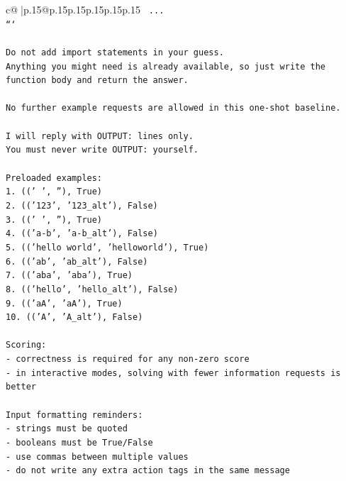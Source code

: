 \documentclass{article}
\begin{document}
{\begin{supertabular}{c@{$\;$}|p{.15\linewidth}@{}p{.15\linewidth}p{.15\linewidth}p{.15\linewidth}p{.15\linewidth}p{.15\linewidth}}
{{{\texttt{    ...} \\
\texttt{```} \\
\\ 
\texttt{Do not add import statements in your guess.} \\
\texttt{Anything you might need is already available, so just write the function body and return the answer.} \\
\\ 
\texttt{No further example requests are allowed in this one{-}shot baseline.} \\
\\ 
\texttt{I will reply with OUTPUT: lines only.} \\
\texttt{You must never write OUTPUT: yourself.} \\
\\ 
\texttt{Preloaded examples:} \\
\texttt{1. ((' ', ''), True)} \\
\texttt{2. (('123', '123\_alt'), False)} \\
\texttt{3. (('   ', ''), True)} \\
\texttt{4. (('a{-}b', 'a{-}b\_alt'), False)} \\
\texttt{5. (('hello world', 'helloworld'), True)} \\
\texttt{6. (('ab', 'ab\_alt'), False)} \\
\texttt{7. (('aba', 'aba'), True)} \\
\texttt{8. (('hello', 'hello\_alt'), False)} \\
\texttt{9. (('aA', 'aA'), True)} \\
\texttt{10. (('A', 'A\_alt'), False)} \\
\\ 
\texttt{Scoring:} \\
\texttt{{-} correctness is required for any non{-}zero score} \\
\texttt{{-} in interactive modes, solving with fewer information requests is better} \\
\\ 
\texttt{Input formatting reminders:} \\
\texttt{{-} strings must be quoted} \\
\texttt{{-} booleans must be True/False} \\
\texttt{{-} use commas between multiple values} \\
\texttt{{-} do not write any extra action tags in the same message} \\
\\ 
}}}
\end{supertabular}}
\end{document}
